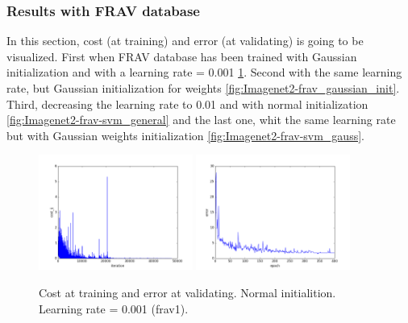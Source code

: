 \subsubsection{Results with FRAV database}

In this section, cost (at training) and error (at validating) is going to be visualized. First when FRAV database has been trained with Gaussian initialization and with a learning rate = 0.001 \ref{fig:Imagenet2-frav1}. Second with the same learning rate, but Gaussian initialization for weights \ref{fig:Imagenet2-frav_gaussian_init}. Third, decreasing the learning rate to 0.01 and with normal initialization \ref{fig:Imagenet2-frav-svm_general} and the last one, whit the same learning rate but with Gaussian weights initialization \ref{fig:Imagenet2-frav-svm_gauss}.\\

\begin{figure}[htb]
\centering
\includegraphics[width=0.45\textwidth]{images/FRAv_casia_ImageNet/Imagenet2/frav/frav1/cost_frav.png}
\includegraphics[width=0.45\textwidth]{images/FRAv_casia_ImageNet/Imagenet2/frav/frav1/error_frav.png}
\caption{Cost at training and error at validating. Normal initialition. Learning rate = 0.001 (frav1).} \label{fig:Imagenet2-frav1}
\end{figure}

